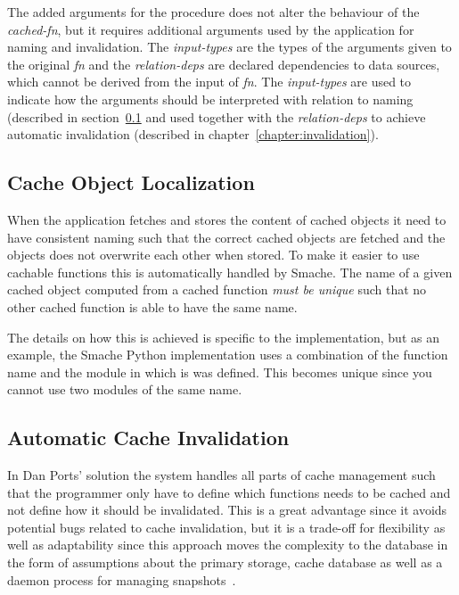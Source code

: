 The added arguments for the procedure does not alter the behaviour of the \emph{cached-fn}, but it requires additional arguments used by the application for naming and invalidation. The \emph{input-types} are the types of the arguments given to the original \emph{fn} and the \emph{relation-deps} are declared dependencies to data sources, which cannot be derived from the input of \emph{fn}. The \emph{input-types} are used to indicate how the arguments should be interpreted with relation to naming (described in section~\ref{subsec:cache-object-localization} and used together with the \emph{relation-deps} to achieve automatic invalidation (described in chapter~\ref{chapter:invalidation}).

\subsection{Cache Object Localization}
\label{subsec:cache-object-localization}

When the application fetches and stores the content of cached objects it need to have consistent naming such that the correct cached objects are fetched and the objects does not overwrite each other when stored. To make it easier to use cachable functions this is automatically handled by Smache. The name of a given cached object computed from a cached function \emph{must be unique} such that no other cached function is able to have the same name.

The details on how this is achieved is specific to the implementation, but as an example, the Smache Python implementation uses a combination of the function name and the module in which is was defined. This becomes unique since you cannot use two modules of the same name.





\subsection{Automatic Cache Invalidation}
\label{subsec:automatic_cache_invalidation}

In Dan Ports' solution the system handles all parts of cache management such that the programmer only have to define which functions needs to be cached and not define how it should be invalidated. This is a great advantage since it avoids potential bugs related to cache invalidation, but it is a trade-off for flexibility as well as adaptability since this approach moves the complexity to the database in the form of assumptions about the primary storage, cache database as well as a daemon process for managing snapshots~\cite{paper:liskov}.

